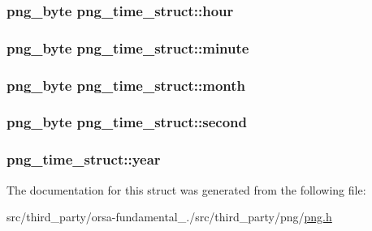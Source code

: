 \subsubsection[{hour}]{\setlength{\rightskip}{0pt plus 5cm}png\+\_\+byte png\+\_\+time\+\_\+struct\+::hour}\label{structpng__time__struct_a79ac8b217254fd87cdc7299e6612a6f4}
\hypertarget{structpng__time__struct_ad3ce11e9d92b77a33b3f7480bf0fff8c}{}
\subsubsection[{minute}]{\setlength{\rightskip}{0pt plus 5cm}png\+\_\+byte png\+\_\+time\+\_\+struct\+::minute}\label{structpng__time__struct_ad3ce11e9d92b77a33b3f7480bf0fff8c}
\hypertarget{structpng__time__struct_a3ab550977ee2cb1165c0398131f2e601}{}
\subsubsection[{month}]{\setlength{\rightskip}{0pt plus 5cm}png\+\_\+byte png\+\_\+time\+\_\+struct\+::month}\label{structpng__time__struct_a3ab550977ee2cb1165c0398131f2e601}
\hypertarget{structpng__time__struct_a84e528e4c4c7d76cd2252e0d0d2ed0c9}{}
\subsubsection[{second}]{\setlength{\rightskip}{0pt plus 5cm}png\+\_\+byte png\+\_\+time\+\_\+struct\+::second}\label{structpng__time__struct_a84e528e4c4c7d76cd2252e0d0d2ed0c9}
\hypertarget{structpng__time__struct_a5cceb6213fc7b4462435ea1d8fc1c798}{}
\subsubsection[{year}]{ png\+\_\+time\+\_\+struct\+::year}\label{structpng__time__struct_a5cceb6213fc7b4462435ea1d8fc1c798}


The documentation for this struct was generated from the following file\+:\begin{DoxyCompactItemize}
\item 
src/third\+\_\+party/orsa-\/fundamental\+\_./src/third\+\_\+party/png/\hyperlink{png_8h}{png.\+h}\end{DoxyCompactItemize}

